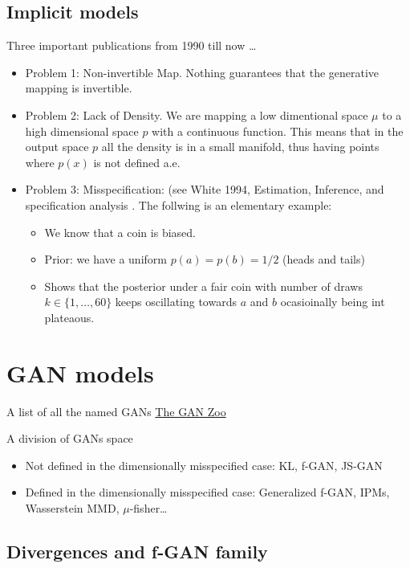\subsection{Implicit models}

Three important publications from 1990 till now \dots

\begin{itemize}
  \item Problem 1: Non-invertible Map. Nothing guarantees that the generative
    mapping is invertible.
  \item Problem 2: Lack of Density. We are mapping a low dimentional space
    $\mu$ to a high dimensional space $p$ with a continuous function. This
    means that in the output space $p$ all the density is in a small manifold,
    thus having points where $p(x)$ is not defined a.e.
  \item Problem 3: Misspecification: (see White 1994, Estimation, Inference,
      and specification analysis \cite{white1996estimation}. The follwing is an
      elementary example:
      \begin{itemize}
        \item We know that a coin is biased.
        \item Prior: we have a uniform $p(a) = p(b) = 1/2$ (heads and tails)
        \item Shows that the posterior under a fair coin with number of draws
          $k \in \{1,\dots,60\}$ keeps oscillating towards $a$ and  $b$
          ocasioinally being int plateaous.
      \end{itemize}
\end{itemize}

\section{GAN models}

A list of all the named GANs
\href{https://github.com/hindupuravinash/the-gan-zoo}{The GAN Zoo}

A division of GANs space

\begin{itemize}
  \item Not defined in the dimensionally misspecified case: KL, f-GAN, JS-GAN
  \item Defined in the dimensionally misspecified case: Generalized f-GAN,
    IPMs, Wasserstein MMD, $\mu$-fisher\dots
\end{itemize}

\subsection{Divergences and f-GAN family}

